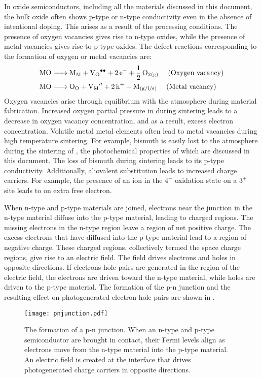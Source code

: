 In oxide semiconductors, including all the materials discussed in this document, the bulk oxide often shows p-type or n-type conductivity even in the absence of intentional doping. This arises as a result of the processing conditions. The presence of oxygen vacancies gives rise to n-type oxides, while the presence of metal vacancies gives rise to p-type oxides. The defect reactions corresponding to the formation of oxygen or metal vacancies are:
\begin{align}
	\ce{MO}&\ce{-> M_M + V_O^{\bullet\bullet} + 2e- + 1/2O2_{(g)} \hspace{1em} \text{(Oxygen~vacancy)}} \\
	\ce{MO}&\ce{-> O_O + V_M^{$\prime\prime$} + 2h+ + M_{(g/l/s)} \hspace{1em} \text{(Metal~vacancy)}}
\end{align}
Oxygen vacancies arise through equilibrium with the atmosphere during material fabrication. Increased oxygen partial pressure in during sintering leads to a decrease in oxygen vacancy concentration, and as a result, excess electron concentration. Volatile metal metal elements often lead to metal vacancies during high temperature sintering. For example, bismuth is easily lost to the atmosphere during the sintering of , the photochemical properties of which are discussed in this document. The loss of bismuth during sintering leads to its p-type conductivity. Additionally, aliovalent substitution leads to increased charge carriers. For example, the presence of an ion in the $4^{+}$ oxidation state on a $3^{+}$ site leads to on extra free electron.

When n-type and p-type materials are joined, electrons near the junction in the n-type material diffuse into the p-type material, leading to charged regions. The missing electrons in the n-type region leave a region of net positive charge. The excess electrons that have diffused into the p-type material lead to a region of  negative charge. These charged regions, collectively termed the space charge regions, give rise to an electric field. The field drives electrons and holes in opposite directions. If electrons-hole pairs are generated in the region of the electric field, the electrons are driven toward the n-type material, while holes are driven to the p-type material. The formation of the p-n junction and the resulting effect on photogenerated electron hole pairs are shown in .

\begin{figure}
	\texttt{[image: pnjunction.pdf]}
		\caption[The formation of a p-n junction]{%
			The formation of a p-n junction. When an n-type and p-type 
			semiconductor are brought in contact, their Fermi levels 
			align as electrons move from the n-type material into the 
			p-type material. An electric field is created at the 
			interface that drives photogenerated charge carriers in 
			opposite directions.}
	\label{fig:pnjunction}
\end{figure}

